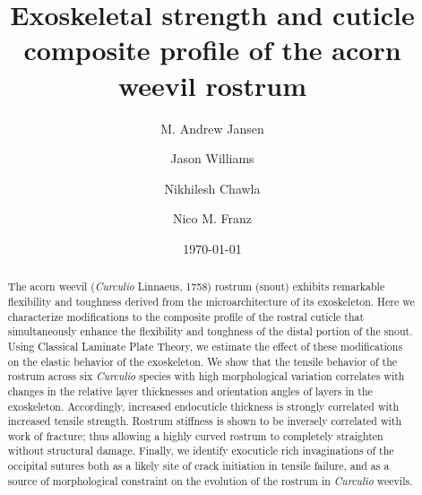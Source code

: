 \documentclass[twocolumn, linenumbers, superscriptaddress, nofootinbib]{revtex4-1}
\begin{document}
	\begin{abstract}
		The acorn weevil (\textit{Curculio} Linnaeus, 1758) rostrum (snout) exhibits remarkable flexibility and toughness derived from the microarchitecture of its exoskeleton.
		Here we characterize modifications to the composite profile of the rostral cuticle that simultaneously enhance the flexibility and toughness of the distal portion of the snout.
		Using Classical Laminate Plate Theory, we estimate the effect of these modifications on the elastic behavior of the exoskeleton.
		We show that the tensile behavior of the rostrum across six \textit{Curculio} species with high morphological variation correlates with changes in the relative layer thicknesses and orientation angles of layers in the exoskeleton.
		Accordingly, increased endocuticle thickness is strongly correlated with increased tensile strength.
		Rostrum stiffness is shown to be inversely correlated with work of fracture; thus allowing a highly curved rostrum to completely straighten without structural damage.
		Finally, we identify exocuticle rich invaginations of the occipital sutures both as a likely site of crack initiation in tensile failure, and as a source of morphological constraint on the evolution of the rostrum in \textit{Curculio} weevils.
	\end{abstract}
	
	{\title{Exoskeletal strength and cuticle composite profile of the acorn weevil rostrum}
	\date{\today}
	
	\author{M. Andrew Jansen}
	\author{Jason Williams}
	\author{Nikhilesh Chawla}
	\author{Nico M. Franz}
		
	\maketitle
	}
\end{document}
